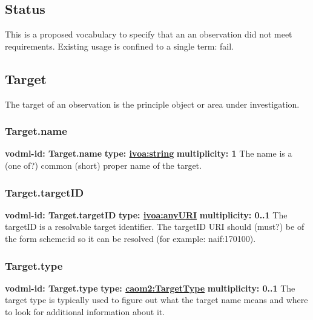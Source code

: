   \subsection{Status}
  \label{sect:Status}
    This is a proposed vocabulary to specify that an an observation did not meet requirements. Existing usage is confined to a single term: fail.

  \subsection{Target}
  \label{sect:Target}
    The target of an observation is the principle object or area under investigation.

    \subsubsection{Target.name}
      \textbf{vodml-id: Target.name} \newline
      \textbf{type: \hyperref[sect:ivoa]{ivoa:string}} \newline
      \textbf{multiplicity: 1} \newline
      The name is a (one of?) common (short) proper name of the target.

    \subsubsection{Target.targetID}
      \textbf{vodml-id: Target.targetID} \newline
      \textbf{type: \hyperref[sect:ivoa]{ivoa:anyURI}} \newline
      \textbf{multiplicity: 0..1} \newline
      The targetID is a resolvable target identifier. The targetID URI should (must?) be of the form {scheme}:{id} so it can be resolved (for example: naif:170100).

    \subsubsection{Target.type}
      \textbf{vodml-id: Target.type} \newline
      \textbf{type: \hyperref[sect:TargetType]{caom2:TargetType}} \newline
      \textbf{multiplicity: 0..1} \newline
      The target type is typically used to figure out what the target name means and where to look for additional information about it.

